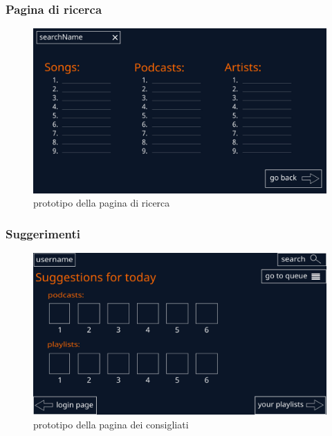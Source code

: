 \documentclass{article}
\begin{document}
  \subsubsection{Pagina di ricerca}
  \begin{figure}[H]
    \centering
    \includegraphics[scale=0.25]{search}
    \caption{prototipo della pagina di ricerca}
    \label{fig:searchPage}
  \end{figure}

  \subsubsection{Suggerimenti}
  \begin{figure}[H]
    \centering
    \includegraphics[scale=0.25]{suggestions}
    \caption{prototipo della pagina dei consigliati}
    \label{fig:suggestionsPage}
  \end{figure}
\end{document}
